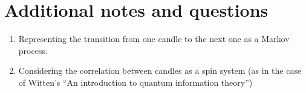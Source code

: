 \documentclass[twocolumn,aps,pra,superscriptaddress,nofootinbib,longbibliography]{revtex4-2}
\begin{document}
\section{Additional notes and questions}

\begin{enumerate}
    \item Representing the transition from one candle to the next one as a Markov process.
    \item Considering the correlation between candles as a spin system (as in the case of Witten's ``An introduction to quantum information theory'') 
\end{enumerate}




\clearpage



\end{document}
